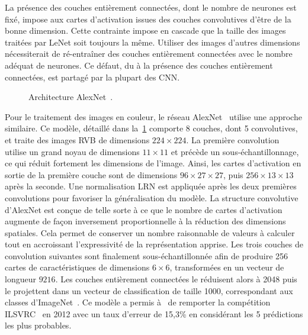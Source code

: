 La présence des couches entièrement connectées, dont le nombre de neurones est fixé, impose aux cartes d'activation issues des couches convolutives d'être de la bonne dimension. Cette contrainte impose en cascade que la taille des images traitées par LeNet soit toujours la même. Utiliser des images d'autres dimensions nécessiterait de ré-entraîner des couches entièrement connectées avec le nombre adéquat de neurones. Ce défaut, du à la présence des couches entièrement connectées, est partagé par la plupart des \gls{CNN}.

\begin{figure}[t]
  \resizebox{\textwidth}{!}{
    
  }
  \caption[Architecture AlexNet]{Architecture AlexNet~\cite{krizhevsky_imagenet_2012}.}
  \label{fig:alexnet}
\end{figure}

Pour le traitement des images en couleur, le réseau AlexNet~\cite{krizhevsky_imagenet_2012} utilise une approche similaire. Ce modèle, détaillé dans la~\cref{fig:alexnet} comporte 8 couches, dont 5 convolutives, et traite des images \gls{RVB} de dimensions $224\times224$. La première convolution utilise un grand noyau de dimensions $11\times11$ et précède un sous-échantillonnage, ce qui réduit fortement les dimensions de l'image. Ainsi, les cartes d'activation en sortie de la première couche sont de dimensions $96\times27\times27$, puis $256\times13\times13$ après la seconde. Une normalisation \gls{LRN} est appliquée après les deux premières convolutions pour favoriser la généralisation du modèle. La structure convolutive d'AlexNet est conçue de telle sorte à ce que le nombre de cartes d'activation augmente de façon inversement proportionnelle à la réduction des dimensions spatiales. Cela permet de conserver un nombre raisonnable de valeurs à calculer tout en accroissant l'expressivité de la représentation apprise. Les trois couches de convolution suivantes sont finalement sous-échantillonnée afin de produire 256 cartes de caractéristiques de dimensions $6\times6$, transformées en un vecteur de longueur $9216$.
Les couches entièrement connectées le réduisent alors à 2048 puis le projettent dans un vecteur de classification de taille 1000, correspondant aux classes d'ImageNet~\cite{deng_imagenet_2009}. Ce modèle a permis à~\citet{krizhevsky_imagenet_2012} de remporter la compétition \gls{ILSVRC}~\cite{russakovsky_imagenet_2015} en 2012 avec un taux d'erreur de 15,3\% en considérant les 5 prédictions les plus probables.

